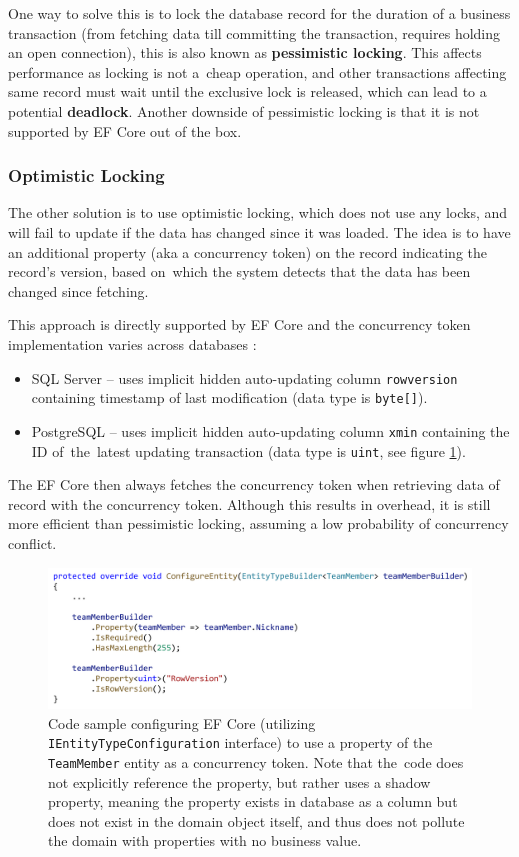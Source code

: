 One way to solve this is to lock the database record for the duration of a business transaction (from fetching data till committing the transaction, requires holding an open connection), this is also known as \textbf{pessimistic locking}. This affects performance as locking is not a~cheap operation, and other transactions affecting same record must wait until the exclusive lock is released, which can lead to a potential \textbf{deadlock}. Another downside of pessimistic locking is that it is not supported by EF Core out of the box.

\subsubsection{Optimistic Locking}
The other solution is to use optimistic locking, which does not use any locks, and will fail to update if the data has changed since it was loaded. The idea is to have an additional property (aka a concurrency token) on the record indicating  the record's version, based on~which the system detects that the data has been changed since fetching.

This approach is directly supported by EF Core and the concurrency token implementation varies across databases \cite{postgres_ef_core_docs:concurrency}:
\begin{itemize}
    \item SQL Server -- uses implicit hidden auto-updating column \texttt{rowversion} containing timestamp of last modification (data type is \texttt{byte[]}).
    \item PostgreSQL -- uses implicit hidden auto-updating column \texttt{xmin} containing the ID of~the~latest updating transaction (data type is \texttt{uint}, see figure \ref{fig:concurrency_token}).
\end{itemize}

The EF Core then always fetches the concurrency token when retrieving data of record with the concurrency token. Although this results in overhead, it is still more efficient than pessimistic locking, assuming a low probability of concurrency conflict.

\begin{figure} [H]
    \centering
    \includegraphics[width=\textwidth]{figures/concurrency-token.pdf}
    \caption{Code sample configuring EF Core (utilizing \texttt{IEntityTypeConfiguration} interface) to use a property of the \texttt{TeamMember} entity as a concurrency token. Note that the~code does not explicitly reference the property, but rather uses a shadow property, meaning the property exists in database as a column but does not exist in the domain object itself, and thus does not pollute the domain with properties with no business value.}
    \label{fig:concurrency_token}
\end{figure}

